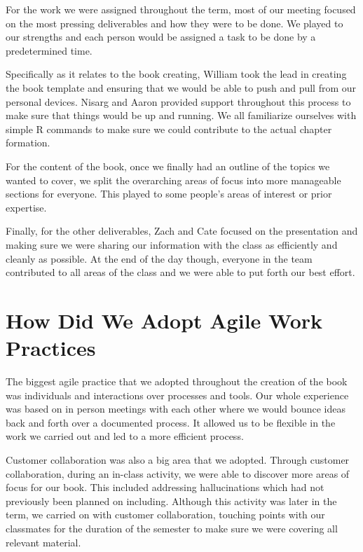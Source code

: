 \documentclass[
]{book}
\begin{document}
For the work we were assigned throughout the term, most of our meeting focused on the most pressing deliverables and how they were to be done. We played to our strengths and each person would be assigned a task to be done by a predetermined time.

Specifically as it relates to the book creating, William took the lead in creating the book template and ensuring that we would be able to push and pull from our personal devices. Nisarg and Aaron provided support throughout this process to make sure that things would be up and running. We all familiarize ourselves with simple R commands to make sure we could contribute to the actual chapter formation.

For the content of the book, once we finally had an outline of the topics we wanted to cover, we split the overarching areas of focus into more manageable sections for everyone. This played to some people's areas of interest or prior expertise.

Finally, for the other deliverables, Zach and Cate focused on the presentation and making sure we were sharing our information with the class as efficiently and cleanly as possible. At the end of the day though, everyone in the team contributed to all areas of the class and we were able to put forth our best effort.

\hypertarget{how-did-we-adopt-agile-work-practices}{%
\section{How Did We Adopt Agile Work Practices}\label{how-did-we-adopt-agile-work-practices}}

The biggest agile practice that we adopted throughout the creation of the book was individuals and interactions over processes and tools. Our whole experience was based on in person meetings with each other where we would bounce ideas back and forth over a documented process. It allowed us to be flexible in the work we carried out and led to a more efficient process.

Customer collaboration was also a big area that we adopted. Through customer collaboration, during an in-class activity, we were able to discover more areas of focus for our book. This included addressing hallucinations which had not previously been planned on including. Although this activity was later in the term, we carried on with customer collaboration, touching points with our classmates for the duration of the semester to make sure we were covering all relevant material.
\end{document}
